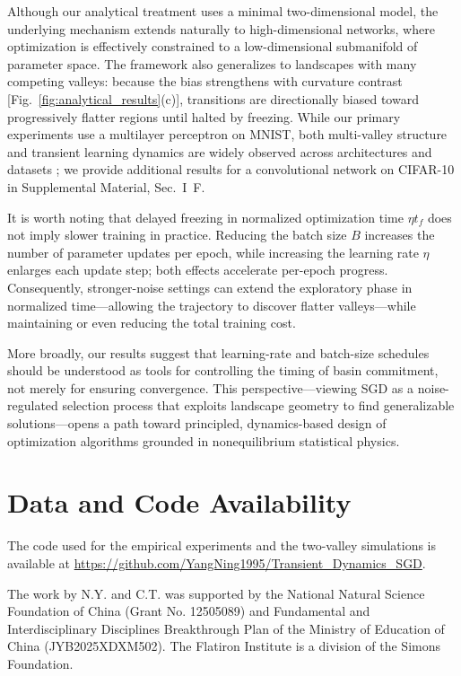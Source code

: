 \documentclass[aps,prx,reprint,superscriptaddress,longbibliography,nofootinbib,floatfix]{revtex4-2}
\begin{document}
Although our analytical treatment uses a minimal two-dimensional model, the underlying mechanism extends naturally to high-dimensional networks, where optimization is effectively constrained to a low-dimensional submanifold of parameter space. The framework also generalizes to landscapes with many competing valleys: because the bias strengthens with curvature contrast [Fig.~\ref{fig:analytical_results}(c)], transitions are directionally biased toward progressively flatter regions until halted by freezing. While our primary experiments use a multilayer perceptron on MNIST, both multi-valley structure and transient learning dynamics are widely observed across architectures and datasets \cite{fortLargeScaleStructure2019,garipovLossSurfacesMode2018,achilleCriticalLearningPeriods2019,jastrzebskiBreakEvenPointOptimization2020,kalraPhaseDiagramEarly2023}; we provide additional results for a convolutional network on CIFAR-10 in Supplemental Material, Sec.~I~F.

It is worth noting that delayed freezing in normalized optimization time $\eta t_f$ does not imply slower training in practice. Reducing the batch size $B$ increases the number of parameter updates per epoch, while increasing the learning rate $\eta$ enlarges each update step; both effects accelerate per-epoch progress. Consequently, stronger-noise settings can extend the exploratory phase in normalized time---allowing the trajectory to discover flatter valleys---while maintaining or even reducing the total training cost.

More broadly, our results suggest that learning-rate and batch-size schedules should be understood as tools for controlling the timing of basin commitment, not merely for ensuring convergence. This perspective---viewing SGD as a noise-regulated selection process that exploits landscape geometry to find generalizable solutions---opens a path toward principled, dynamics-based design of optimization algorithms grounded in nonequilibrium statistical physics.

\section*{Data and Code Availability}
The code used for the empirical experiments and the two-valley simulations is available at
\url{https://github.com/YangNing1995/Transient_Dynamics_SGD}.

\begin{acknowledgments}
The work by N.Y. and C.T. was supported by the National Natural Science Foundation of China (Grant No. 12505089) and Fundamental and Interdisciplinary Disciplines Breakthrough Plan of the Ministry of Education of China (JYB2025XDXM502). The Flatiron Institute is a division of the Simons Foundation.
\end{acknowledgments}
\end{document}
